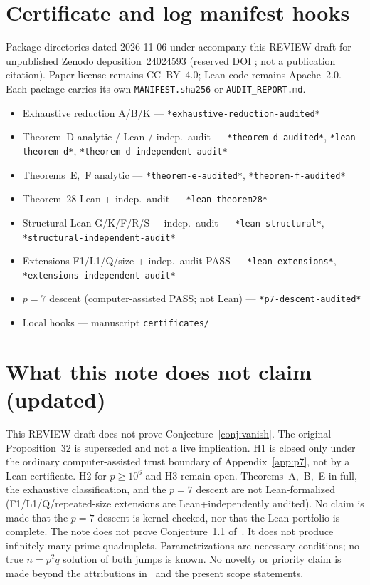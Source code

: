 \documentclass[11pt,reqno]{amsart}
\theoremstyle{definition}
\begin{document}
\section{Certificate and log manifest hooks}
\label{sec:manifest}

Package directories dated 2026-11-06 under  accompany this REVIEW draft for unpublished Zenodo deposition~24024593 (reserved DOI ; not a publication citation). Paper license remains CC~BY~4.0; Lean code remains Apache~2.0. Each package carries its own \texttt{MANIFEST.sha256} or \texttt{AUDIT\_REPORT.md}.

{\raggedright
\begin{itemize}\setlength{\itemsep}{2pt}
\item Exhaustive reduction A/B/K --- \texttt{*exhaustive-reduction-audited*}
\item Theorem~D analytic / Lean / indep.\ audit --- \texttt{*theorem-d-audited*}, \texttt{*lean-theorem-d*}, \texttt{*theorem-d-independent-audit*}
\item Theorems~E,~F analytic --- \texttt{*theorem-e-audited*}, \texttt{*theorem-f-audited*}
\item Theorem~28 Lean + indep.\ audit --- \texttt{*lean-theorem28*}
\item Structural Lean G/K/F/R/S + indep.\ audit --- \texttt{*lean-structural*}, \texttt{*structural-independent-audit*}
\item Extensions F1/L1/Q/size + indep.\ audit PASS --- \texttt{*lean-extensions*}, \texttt{*extensions-independent-audit*}
\item \(p=7\) descent (computer-assisted PASS; not Lean) --- \texttt{*p7-descent-audited*}
\item Local hooks --- manuscript \texttt{certificates/}
\end{itemize}
}

\section*{What this note does not claim (updated)}
\label{sec:noclaim-v011}

This REVIEW draft does not prove Conjecture~\ref{conj:vanish}. The original Proposition~32 is superseded and not a live implication. H1 is closed only under the ordinary computer-assisted trust boundary of Appendix~\ref{app:p7}, not by a Lean certificate. H2 for \(p\ge 10^6\) and H3 remain open. Theorems~A,~B,~E in full, the exhaustive classification, and the \(p=7\) descent are not Lean-formalized (F1/L1/Q/repeated-size extensions are Lean+independently audited). No claim is made that the \(p=7\) descent is kernel-checked, nor that the Lean portfolio is complete. The note does not prove Conjecture~1.1 of~\cite{RCW2026}. It does not produce infinitely many prime quadruplets. Parametrizations are necessary conditions; no true \(n=p^2q\) solution of both jumps is known. No novelty or priority claim is made beyond the attributions in~\cite{RCW2026} and the present scope statements.
\end{document}
